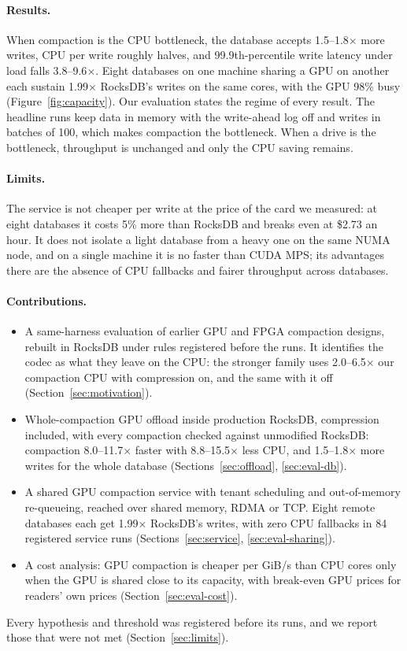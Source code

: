 \documentclass[sigconf, nonacm]{acmart}
\begin{document}
\paragraph{Results.} When compaction is the CPU bottleneck, the database accepts
1.5--1.8$\times$ more writes, CPU per write roughly halves, and 99.9th-percentile write
latency under load falls 3.8--9.6$\times$. Eight databases on one machine sharing a GPU on
another each sustain 1.99$\times$ RocksDB's writes on the same cores, with the GPU 98\% busy
(Figure~\ref{fig:capacity}). Our evaluation states the regime of every result. The headline
runs keep data in memory with the write-ahead log off and writes in batches of 100, which
makes compaction the bottleneck. When a drive is the bottleneck, throughput is unchanged and
only the CPU saving remains.

\paragraph{Limits.} The service is not cheaper per write at the price of the card we
measured: at eight databases it costs 5\% more than RocksDB and breaks even at \$2.73 an hour.
It does not isolate a light database from a heavy one on the same NUMA node, and on a single
machine it is no faster than CUDA MPS; its advantages there are the absence of CPU fallbacks
and fairer throughput across databases.

\paragraph{Contributions.}
\begin{itemize}
  \item A same-harness evaluation of earlier GPU and FPGA compaction designs, rebuilt in
        RocksDB under rules registered before the runs. It identifies the codec as what they
        leave on the CPU: the stronger family uses 2.0--6.5$\times$ our compaction CPU with
        compression on, and the same with it off (Section~\ref{sec:motivation}).
  \item Whole-compaction GPU offload inside production RocksDB, compression included, with
        every compaction checked against unmodified RocksDB: compaction 8.0--11.7$\times$ faster
        with 8.8--15.5$\times$ less CPU, and 1.5--1.8$\times$ more writes for the whole database
        (Sections~\ref{sec:offload}, \ref{sec:eval-db}).
  \item A shared GPU compaction service with tenant scheduling and out-of-memory re-queueing,
        reached over shared memory, RDMA or TCP. Eight remote databases each get 1.99$\times$
        RocksDB's writes, with zero CPU fallbacks in 84 registered service runs
        (Sections~\ref{sec:service}, \ref{sec:eval-sharing}).
  \item A cost analysis: GPU compaction is cheaper per GiB/s than CPU cores only when the
        GPU is shared close to its capacity, with break-even GPU prices for readers' own
        prices (Section~\ref{sec:eval-cost}).
\end{itemize}
Every hypothesis and threshold was registered before its runs, and we report those that were
not met (Section~\ref{sec:limits}).
\end{document}
